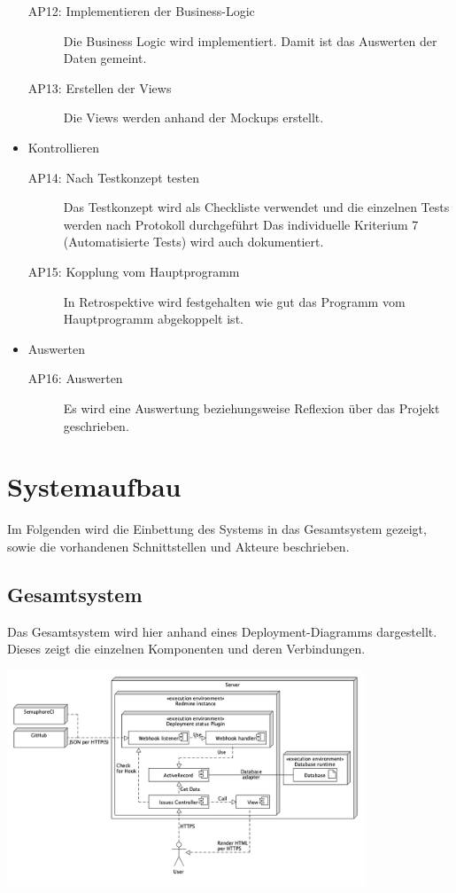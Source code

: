 \begin{itemize}
\begin{description}
        \item[AP12: Implementieren der \gls{Business-Logic}] Die Business Logic wird implementiert. Damit ist das Auswerten der Daten gemeint.
        \item[AP13: Erstellen der \gls{Views}] Die Views werden anhand der \gls{Mockups} erstellt.
    \end{description}
    \item Kontrollieren
    \begin{description}
        \item[AP14: Nach Testkonzept testen] Das Testkonzept wird als Checkliste verwendet und die einzelnen Tests werden nach Protokoll durchgeführt \newline
        Das individuelle Kriterium 7 (Automatisierte Tests) wird auch dokumentiert.
        \item[AP15: Kopplung vom Hauptprogramm] In Retrospektive wird festgehalten wie gut das Programm vom Hauptprogramm abgekoppelt ist.
    \end{description}
    \item Auswerten
    \begin{description}
        \item[AP16: Auswerten] Es wird eine Auswertung beziehungsweise Reflexion über das Projekt geschrieben.
    \end{description}
\end{itemize}

\section{Systemaufbau}
Im Folgenden wird die Einbettung des Systems in das Gesamtsystem gezeigt, sowie die vorhandenen Schnittstellen und Akteure beschrieben.

\begin{minipage}{\textwidth}
    \subsection{Gesamtsystem}
    Das Gesamtsystem wird hier anhand eines Deployment-Diagramms dargestellt. Dieses zeigt die einzelnen Komponenten und deren Verbindungen.
    \begin{center}
        \includegraphics[width=0.8\textwidth]{images/deployment-diagram.png}
        \label{fig:deployment-diagram}
    \end{center}
\end{minipage}

